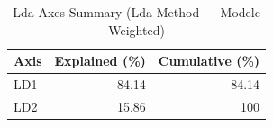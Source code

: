 \begin{table}[htbp]
  \centering
  \caption{Lda Axes Summary (Lda Method — Modelc Weighted)}
  \label{tab:LDA_Method_ModelC_Weighted_tables_lda_axes_summary}
  \begin{tabular}{lrr}
    \toprule
    Axis & Explained (\%) & Cumulative (\%) \\
    \midrule
    LD1 & 84.14 & 84.14 \\
    LD2 & 15.86 & 100 \\
    \bottomrule
  \end{tabular}
\end{table}
